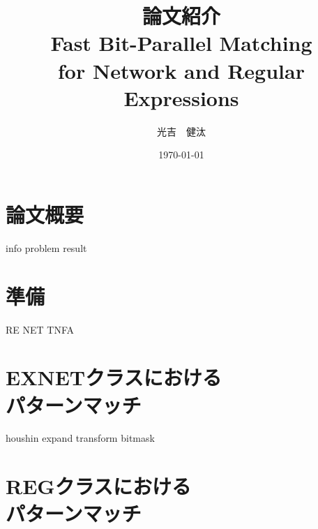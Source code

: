\documentclass[dvipdfmx,12pt,notheorems]{beamer} %
\title[略タイトル]{論文紹介\\ {\normalsize Fast Bit-Parallel Matching \\for Network and Regular Expressions}} %
\author[Mitsuyoshi]{光吉　健汰\inst{1}}
\institute[IKN]{\inst{1}北海道大学工学部 情報エレクトロニクス学科 情報理工学コース 4年\\
情報知識ネットワーク研究室}
\date{\today}%
\begin{document}
\begin{frame}
	\frametitle{}
	\titlepage
\end{frame}


\section{論文概要}
{info}
{problem}
{result}

\section{準備}
{RE}
{NET}
{TNFA}

\section{\textsf{EXNET}クラスにおける\\パターンマッチ}
{houshin}
{expand}
{transform}
{bitmask}

\section{\textsf{REG}クラスにおける\\パターンマッチ}

	
\end{document}
